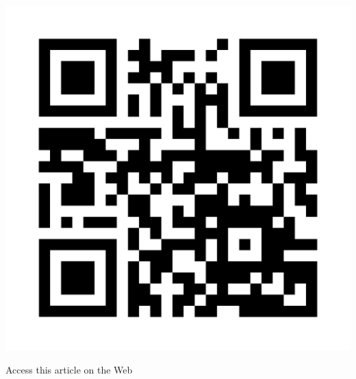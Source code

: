 \begin{multicols}{2}
\begin{center}
\includegraphics{src/Figures/An_Interview_QR.png}
\medskip

{\large Access this article on the Web}
\end{center}
\end{multicols}
\medskip


